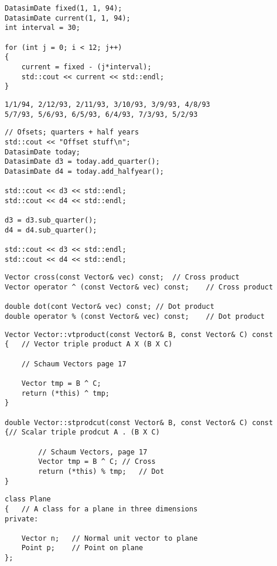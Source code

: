 \begin{lstlisting}
DatasimDate fixed(1, 1, 94);
DatasimDate current(1, 1, 94);
int interval = 30;

for (int j = 0; i < 12; j++)
{
	current = fixed - (j*interval);
	std::cout << current << std::endl;
}
\end{lstlisting}

\begin{lstlisting}
1/1/94, 2/12/93, 2/11/93, 3/10/93, 3/9/93, 4/8/93
5/7/93, 5/6/93, 6/5/93, 6/4/93, 7/3/93, 5/2/93
\end{lstlisting}

\begin{lstlisting}
// Ofsets; quarters + half years
std::cout << "Offset stuff\n";
DatasimDate today;
DatasimDate d3 = today.add_quarter();
DatasimDate d4 = today.add_halfyear();

std::cout << d3 << std::endl;
std::cout << d4 << std::endl;

d3 = d3.sub_quarter();
d4 = d4.sub_quarter();

std::cout << d3 << std::endl;
std::cout << d4 << std::endl;
\end{lstlisting}


\begin{lstlisting}
Vector cross(const Vector& vec) const;	// Cross product
Vector operator ^ (const Vector& vec) const;	// Cross product

double dot(cont Vector& vec) const;	// Dot product
double operator % (const Vector& vec) const;	// Dot product
\end{lstlisting}

\begin{lstlisting}
Vector Vector::vtproduct(const Vector& B, const Vector& C) const
{	// Vector triple product A X (B X C)

	// Schaum Vectors page 17

	Vector tmp = B ^ C;
	return (*this) ^ tmp;
}

double Vector::stprodcut(const Vector& B, const Vector& C) const
{// Scalar triple prodcut A . (B X C)

		// Schaum Vectors, page 17
		Vector tmp = B ^ C;	// Cross
		return (*this) % tmp;	// Dot
}
\end{lstlisting}

\begin{lstlisting}
class Plane
{	// A class for a plane in three dimensions
private:

	Vector n;	// Normal unit vector to plane
	Point p;	// Point on plane
};
\end{lstlisting}

